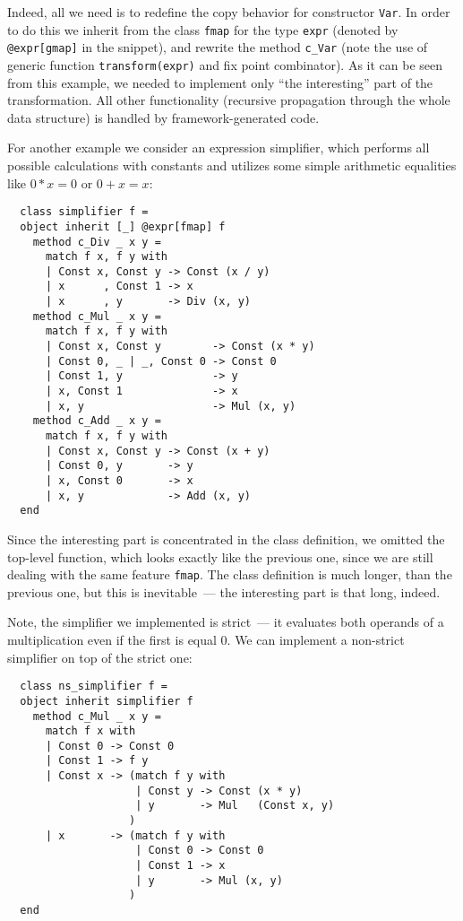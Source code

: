 \documentclass[twocolumn,8pt]{extarticle}
\newcommand{\cd}[1]{\texttt{#1}}
\begin{document}
Indeed, all we need is to redefine the copy behavior for constructor \cd{Var}. In order to do this we inherit from the class \cd{fmap} for the type
\cd{expr} (denoted by \cd{@expr[gmap]} in the snippet), and rewrite the method \cd{c\_Var} (note the use of generic function \cd{transform(expr)} and
fix point combinator). As it can be seen from this example, we needed to implement only ``the interesting'' part of the transformation. All other
functionality (recursive propagation through the whole data structure) is handled by framework-generated code.

For another example we consider an expression simplifier, which performs all possible calculations with constants and utilizes some
simple arithmetic equalities like $0*x=0$ or $0+x=x$:

\begin{lstlisting}
  class simplifier f =
  object inherit [_] @expr[fmap] f
    method c_Div _ x y =
      match f x, f y with
      | Const x, Const y -> Const (x / y)
      | x      , Const 1 -> x
      | x      , y       -> Div (x, y)
    method c_Mul _ x y =
      match f x, f y with
      | Const x, Const y        -> Const (x * y)
      | Const 0, _ | _, Const 0 -> Const 0
      | Const 1, y              -> y
      | x, Const 1              -> x
      | x, y                    -> Mul (x, y)
    method c_Add _ x y =
      match f x, f y with
      | Const x, Const y -> Const (x + y)
      | Const 0, y       -> y
      | x, Const 0       -> x
      | x, y             -> Add (x, y)
  end
\end{lstlisting}

Since the interesting part is concentrated in the class definition, we omitted the top-level function, which looks exactly like the previous one,
since we are still dealing with the same feature \cd{fmap}. The class definition is much longer, than the previous one, but this is
inevitable~--- the interesting part is that long, indeed.

Note, the simplifier we implemented is strict~--- it evaluates both operands of a multiplication even if the first is equal 0. We can implement
a non-strict simplifier on top of the strict one:

\begin{lstlisting}
  class ns_simplifier f =
  object inherit simplifier f 
    method c_Mul _ x y =
      match f x with
      | Const 0 -> Const 0
      | Const 1 -> f y
      | Const x -> (match f y with                      
                    | Const y -> Const (x * y)
                    | y       -> Mul   (Const x, y)
                   )
      | x       -> (match f y with
                    | Const 0 -> Const 0
                    | Const 1 -> x
                    | y       -> Mul (x, y)
                   )
  end
\end{lstlisting}
\end{document}

